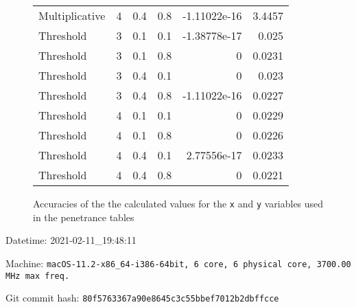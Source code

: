\documentclass{article}
\begin{document}
\begin{figure}[H]
\begin{tabular}{lrrrrr}
 Multiplicative &       4 &   0.4 &            0.8 & -1.11022e-16 &            3.4457 \\
 Threshold      &       3 &   0.1 &            0.1 & -1.38778e-17 &            0.025  \\
 Threshold      &       3 &   0.1 &            0.8 &  0           &            0.0231 \\
 Threshold      &       3 &   0.4 &            0.1 &  0           &            0.023  \\
 Threshold      &       3 &   0.4 &            0.8 & -1.11022e-16 &            0.0227 \\
 Threshold      &       4 &   0.1 &            0.1 &  0           &            0.0229 \\
 Threshold      &       4 &   0.1 &            0.8 &  0           &            0.0226 \\
 Threshold      &       4 &   0.4 &            0.1 &  2.77556e-17 &            0.0233 \\
 Threshold      &       4 &   0.4 &            0.8 &  0           &            0.0221 \\
\hline
\end{tabular}
\caption{Accuracies of the the calculated values for the \texttt{x} and \texttt{y} variables used in the penetrance tables}
\end{figure}
Datetime: 2021-02-11\_19:48:11

Machine: \texttt{macOS-11.2-x86\_64-i386-64bit, 6 core, 6 physical core, 3700.00 MHz max freq.}

Git commit hash: \texttt{80f5763367a90e8645c3c55bbef7012b2dbffcce}
\end{document}
